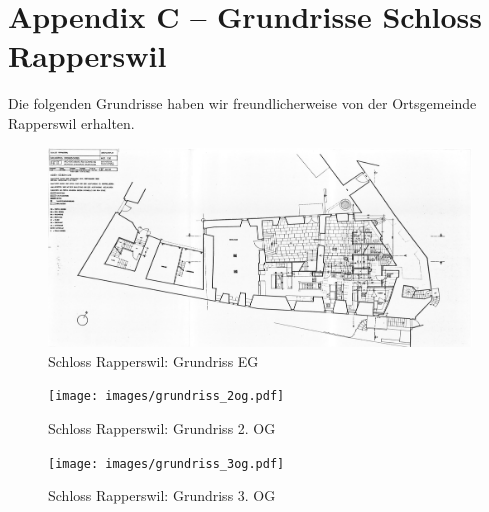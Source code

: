 \chapter{Appendix C -- Grundrisse Schloss Rapperswil}

\label{ch:groundplan}

Die folgenden Grundrisse haben wir freundlicherweise von der Ortsgemeinde
Rapperswil erhalten.

\begin{figure}[H]
	\centering
	\includegraphics[width=0.75\textheight,angle=90]{images/grundriss_eg.pdf}
	\caption{Schloss Rapperswil: Grundriss EG}
	\label{img:groundplan:eg}
\end{figure}

\begin{figure}[H]
	\centering
	\texttt{[image: images/grundriss\_2og.pdf]}
	\caption{Schloss Rapperswil: Grundriss 2. OG}
	\label{img:groundplan:2og}
\end{figure}

\begin{figure}[H]
	\centering
	\texttt{[image: images/grundriss\_3og.pdf]}
	\caption{Schloss Rapperswil: Grundriss 3. OG}
	\label{img:groundplan:3og}
\end{figure}
